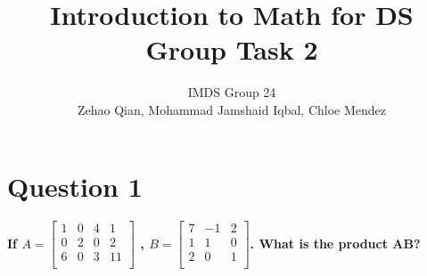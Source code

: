 \documentclass[11pt]{article} %
\title{Introduction to Math for DS Group Task 2}
\author{IMDS Group 24 \\ Zehao Qian, Mohammad Jamshaid Iqbal, Chloe Mendez}
\begin{document}
\maketitle
% 
% 
% 
\section{Question 1}
% 
% 
% 
\paragraph{If \( A = \begin{bmatrix}
        1 & 0 & 4 & 1  \\
        0 & 2 & 0 & 2  \\
        6 & 0 & 3 & 11 \\
    \end{bmatrix} \)
    ,
    \( B = \begin{bmatrix}
        7 & -1 & 2 \\
        1 & 1  & 0 \\
        2 & 0  & 1 \\
    \end{bmatrix} \). What is the product AB?}
% 
% 
% 
% 
% 
% 
% 
% 
% 
\end{document}
